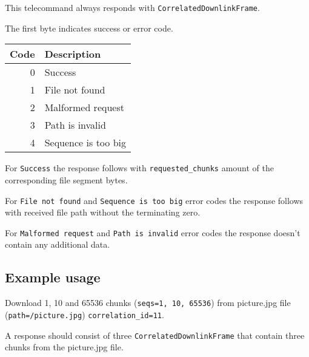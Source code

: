 This telecommand always responds with \texttt{CorrelatedDownlinkFrame}.

The first byte indicates success or error code.

\begin{tabular}{r | l}
	Code & Description \\ \hline
	0 		& Success \\
	1 		& File not found \\
	2 		& Malformed request \\
	3 		& Path is invalid \\
	4 		& Sequence is too big
\end{tabular}

For \texttt{Success} the response follows with \texttt{requested\_chunks} amount of the corresponding file segment bytes.

For \texttt{File not found} and \texttt{Sequence is too big} error codes the response follows with received file path without the terminating zero.

For \texttt{Malformed request} and \texttt{Path is invalid} error codes the response doesn't contain any additional data.

\subsection{Example usage}
Download 1, 10 and 65536 chunks (\texttt{seqs=1, 10, 65536}) from picture.jpg file (\texttt{path=/picture.jpg}) \texttt{correlation\_id=11}.


A response should consist of three \texttt{CorrelatedDownlinkFrame} that contain three chunks from the picture.jpg file.